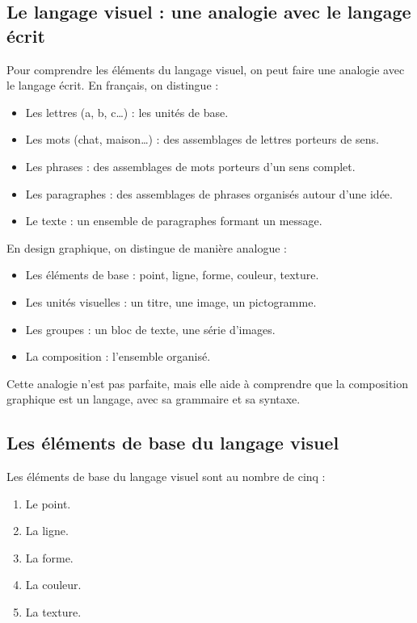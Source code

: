 \subsection{Le langage visuel : une analogie avec le langage écrit}

Pour comprendre les éléments du langage visuel, on peut faire une analogie avec le langage écrit. En français, on distingue :
\begin{itemize}
  \item Les lettres (a, b, c\ldots) : les unités de base.
  \item Les mots (chat, maison\ldots) : des assemblages de lettres porteurs de sens.
  \item Les phrases : des assemblages de mots porteurs d'un sens complet.
  \item Les paragraphes : des assemblages de phrases organisés autour d'une idée.
  \item Le texte : un ensemble de paragraphes formant un message.
\end{itemize}

En design graphique, on distingue de manière analogue :
\begin{itemize}
  \item Les éléments de base : point, ligne, forme, couleur, texture.
  \item Les unités visuelles : un titre, une image, un pictogramme.
  \item Les groupes : un bloc de texte, une série d'images.
  \item La composition : l'ensemble organisé.
\end{itemize}

Cette analogie n'est pas parfaite, mais elle aide à comprendre que la composition graphique est un langage, avec sa grammaire et sa syntaxe.

\subsection{Les éléments de base du langage visuel}

Les éléments de base du langage visuel sont au nombre de cinq :
\begin{enumerate}
  \item Le point.
  \item La ligne.
  \item La forme.
  \item La couleur.
  \item La texture.
\end{enumerate}

